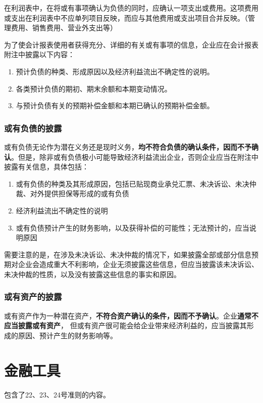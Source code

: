 \documentclass[UTF8,12pt]{ctexart}
\numberwithin{equation}{section} %
\numberwithin{figure}{section}
\numberwithin{table}{section}
\begin{document}
	在利润表中，在将或有事项确认为负债的同时，应确认一项支出或费用。这项费用或支出在利润表中不应单列项目反映，而应与其他费用或支出项目合并反映。（管理费用、销售费用、营业外支出等）
	
	为了使会计报表使用者获得充分、详细的有关或有事项的信息，企业应在会计报表  附注中披露以下内容：
	\begin{enumerate}
		\item 预计负债的种类、形成原因以及经济利益流出不确定性的说明。
		
		\item 各类预计负债的期初、期末余额和本期变动情况。
		
		\item 与预计负债有关的预期补偿金额和本期已确认的预期补偿金额。
	\end{enumerate}
	
	
	\subsubsection{或有负债的披露}
	或有负债无论作为潜在义务还是现时义务，\textbf{均不符合负债的确认条件，因而不予确认}。但是，除非或有负债极小可能导致经济利益流出企业，否则企业应当在附注中披露有关信息，具体包括：
	
	\begin{enumerate}
		\item 或有负债的种类及其形成原因，包括已贴现商业承兑汇票、未决诉讼、未决仲裁、对外提供担保等形成的或有负债
		
		\item 经济利益流出不确定性的说明
		
		\item 或有负债预计产生的财务影响，以及获得补偿的可能性；无法预计的，应当说明原因
	\end{enumerate}
	
	需要注意的是，在涉及未决诉讼、未决仲裁的情况下，如果披露全部或部分信息预期对企业会造成重大不利影响，企业无须披露这些信息，但应当披露该未决诉讼、未决仲裁的性质，以及没有披露这些信息的事实和原因。
	
	
	\subsubsection{或有资产的披露}
	或有资产作为一种潜在资产，\textbf{不符合资产确认的条件，因而不予确认}。企业\textbf{通常不应当披露或有资产}， 但或有资产很可能会给企业带来经济利益的，应当披露其形成的原因、预计产生的财务影响等。
	
	
	\newpage
	\section{金融工具}
	包含了22、23、24号准则的内容。
\end{document}
